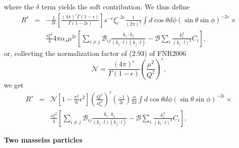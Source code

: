 \documentclass{letter}
\newcommand{\section}[1]{\medskip\bigskip

\noindent\textbf{\LARGE #1}}
\begin{document}
where the $\delta$ term yields the soft contribution. We thus define
\begin{eqnarray}
  R^s & = & - \frac{1}{2 \epsilon} \left[ \frac{(4 \pi)^{\epsilon} \Gamma
  \left( 1 - \epsilon \right)}{\Gamma (1 - 2 \epsilon)} \right] s^{- \epsilon}
  \xi_c^{- 2 \epsilon} \frac{1}{(2 \pi)^3} \int d \cos \theta d \phi (\sin
  \theta \sin \phi)^{- 2 \epsilon} \times \nonumber\\
  &  & \frac{s \xi^2}{4} 4 \pi \alpha_s \mu^{2 \epsilon} \left[ \sum_{i \neq
  j} \mathcal{B}_{i j} \frac{k_i \cdot k_j}{(k_i \cdot l) (k_j \cdot l)} -
  \mathcal{B} \sum_i \frac{k_i^2}{(k_i \cdot l)^2} C_i \right], 
\end{eqnarray}
or, collecting the normalization factor of (2.93) of FNR2006
\[ \mathcal{N} = \frac{(4 \pi)^{\epsilon} }{\Gamma (1 - \epsilon)} \left(
   \frac{\mu^2}{Q^2} \right)^{\epsilon}, \]
we get
\begin{eqnarray}
  R^s & = & \mathcal{N}  \left[ 1 - \frac{\pi^2}{6} \epsilon^2 \right] \left(
  \frac{Q^2}{s \xi_c^2} \right)^{\epsilon} \left( \frac{- 1}{2 \epsilon}
  \right) \frac{\alpha}{2 \pi} \int d \cos \theta d \phi (\sin \theta \sin
  \phi)^{- 2 \epsilon} \times \nonumber\\
  &  & \frac{s \xi^2 }{4} \left[ \sum_{i \neq j} \mathcal{B}_{i j} \frac{k_i
  \cdot k_j}{(k_i \cdot l) (k_j \cdot l)} - \mathcal{B} \sum_i
  \frac{k_i^2}{(k_i \cdot l)^2} C_i \right], 
\end{eqnarray}

\section{Two masselss particles}
\end{document}
